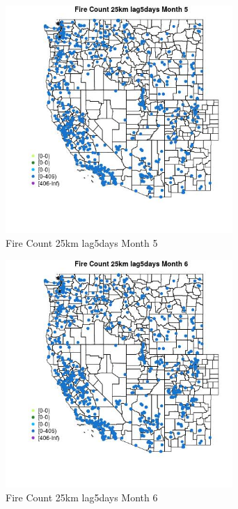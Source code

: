 \begin{figure} 
\centering  
\includegraphics[width=0.77\textwidth]{Code_Outputs/Report_ML_input_PM25_Step4_part_f_de_duplicated_aveswNAs_MapObsMo5Fire_Count_25km_lag5days.jpg} 
\caption{\label{fig:Report_ML_input_PM25_Step4_part_f_de_duplicated_aveswNAsMapObsMo5Fire_Count_25km_lag5days}Fire Count 25km lag5days Month 5} 
\end{figure} 
 

\begin{figure} 
\centering  
\includegraphics[width=0.77\textwidth]{Code_Outputs/Report_ML_input_PM25_Step4_part_f_de_duplicated_aveswNAs_MapObsMo6Fire_Count_25km_lag5days.jpg} 
\caption{\label{fig:Report_ML_input_PM25_Step4_part_f_de_duplicated_aveswNAsMapObsMo6Fire_Count_25km_lag5days}Fire Count 25km lag5days Month 6} 
\end{figure} 
 

